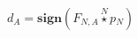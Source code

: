 \documentclass[border=2pt]{standalone}
\begin{document}
${d}{_{A}}=\textbf{sign} \left( {{F}}{_{N, A}} \stackrel{N}{\star} {p}{_{N}} \right)$
\end{document}
